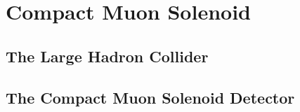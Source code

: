 \chapter{Compact Muon Solenoid}

\section{The Large Hadron Collider} \label{sec:lhc}


\section{The Compact Muon Solenoid Detector} \label{sec:cms}


